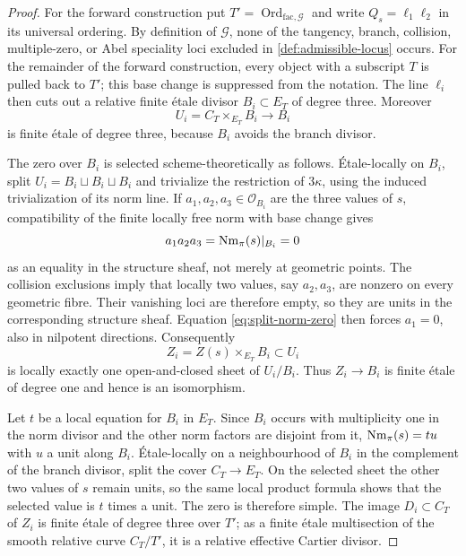 \begin{proof}
For the forward construction put
$T'=\operatorname{Ord}_{\mathrm{fac},\mathscr G}$ and write
$Q_s=\ell_1\ell_2$ in its universal ordering.  By definition of
$\mathscr G$, none of the tangency, branch, collision, multiple-zero, or Abel
speciality loci excluded in \cref{def:admissible-locus} occurs.  For the
remainder of the forward construction, every object with a subscript $T$ is
pulled back to $T'$; this base change is suppressed from the notation.
The line $\ell_i$ then
cuts out a relative finite \'etale divisor $B_i\subset E_T$ of degree three.
Moreover
\[
 U_i=C_T\times_{E_T}B_i\longrightarrow B_i
\]
is finite \'etale of degree three, because $B_i$ avoids the branch divisor.

The zero over $B_i$ is selected scheme-theoretically as follows.  \'Etale-locally on
$B_i$, split $U_i=B_i\sqcup B_i\sqcup B_i$ and trivialize the restriction
of $3\kappa$, using the induced trivialization of its norm line.  If
$a_1,a_2,a_3\in\mathcal O_{B_i}$ are the three values of $s$, compatibility
of the finite locally free norm with base change gives
\begin{equation}
 a_1a_2a_3=\operatorname{Nm}_\pi(s)|_{B_i}=0
\label{eq:split-norm-zero}
\end{equation}
as an equality in the structure sheaf, not merely at geometric points.
The collision exclusions imply that locally two values, say $a_2,a_3$, are
nonzero on every geometric fibre.  Their vanishing loci are therefore empty,
so they are units in the corresponding structure sheaf.  Equation
\eqref{eq:split-norm-zero} then forces $a_1=0$, also in nilpotent directions.
Consequently
\[
 Z_i=Z(s)\times_{E_T}B_i\subset U_i
\]
is locally exactly one open-and-closed sheet of $U_i/B_i$.  Thus
$Z_i\to B_i$ is finite \'etale of degree one and hence is an isomorphism.

Let $t$ be a local equation for $B_i$ in $E_T$.  Since $B_i$ occurs with
multiplicity one in the norm divisor and the other norm factors are
disjoint from it, $\operatorname{Nm}_\pi(s)=t u$ with $u$ a unit along $B_i$.  \'Etale-locally
on a neighbourhood of $B_i$ in the complement of the branch divisor, split
the cover $C_T\to E_T$.  On the selected sheet the other two values of $s$
remain units, so the same local product formula shows that the selected
value is $t$ times a unit.
The zero is therefore simple.  The image $D_i\subset C_T$ of $Z_i$ is
finite \'etale of degree three over $T'$; as a finite \'etale multisection of
the smooth relative curve $C_T/T'$, it is a relative effective Cartier
divisor.


\end{proof}
